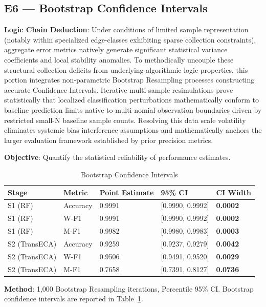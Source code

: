\documentclass[sigconf]{acmart}
\begin{document}
\subsection{E6 --- Bootstrap Confidence Intervals}
\textbf{Logic Chain Deduction}: Under conditions of limited sample representation (notably within specialized edge-classes exhibiting sparse collection constraints), aggregate error metrics natively generate significant statistical variance coefficients and local stability anomalies. To methodically uncouple these structural collection deficits from underlying algorithmic logic properties, this portion integrates non-parametric Bootstrap Resampling processes constructing accurate Confidence Intervals. Iterative multi-sample resimulations prove statistically that localized classification perturbations mathematically conform to baseline prediction limits native to multi-nomial observation boundaries driven by restricted small-N baseline sample counts. Resolving this data scale volatility eliminates systemic bias interference assumptions and mathematically anchors the larger evaluation framework established by prior precision metrics.

\textbf{Objective}: Quantify the statistical reliability of performance estimates.


\begin{table}[!t]
\caption{Bootstrap Confidence Intervals}
\label{tab:bootstrap_ci}
\begin{tabular}{lllll}
\toprule
\textbf{Stage} & \textbf{Metric} & \textbf{Point Estimate} & \textbf{95\% CI} & \textbf{CI Width} \\
\midrule
S1 (RF) & Accuracy & 0.9991 & [0.9990, 0.9992] & \textbf{0.0002} \\
S1 (RF) & W-F1 & 0.9991 & [0.9990, 0.9992] & \textbf{0.0002} \\
S1 (RF) & M-F1 & 0.9982 & [0.9980, 0.9983] & \textbf{0.0003} \\
S2 (TransECA) & Accuracy & 0.9259 & [0.9237, 0.9279] & \textbf{0.0042} \\
S2 (TransECA) & W-F1 & 0.9506 & [0.9491, 0.9520] & \textbf{0.0029} \\
S2 (TransECA) & M-F1 & 0.7658 & [0.7391, 0.8127] & \textbf{0.0736} \\
\bottomrule
\end{tabular}
\end{table}

\textbf{Method}: 1,000 Bootstrap Resampling iterations, Percentile 95\% CI. Bootstrap confidence intervals are reported in Table~\ref{tab:bootstrap_ci}.
\end{document}
